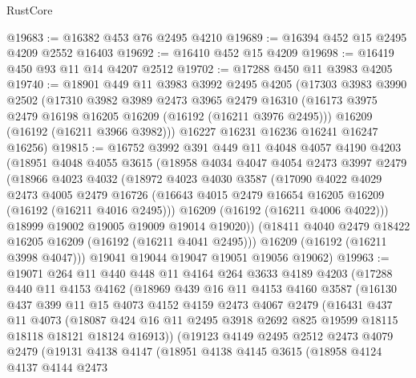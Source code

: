 \begin{lexlean}{RustCore}
\begin{coremodule}
@19683 := @16382 @453 @76 @2495 @4210
@19689 := @16394 @452 @15 @2495 @4209 @2552 @16403
@19692 := @16410 @452 @15 @4209
@19698 := @16419 @450 @93 @11 @14 @4207 @2512
@19702 := @17288 @450 @11 @3983 @4205
@19740 := @18901
    @449
    @11
    @3983
    @3992
    @2495
    @4205
    (@17303
      @3983
      @3990
      @2502
      (@17310
        @3982
        @3989
        @2473
        @3965
        @2479
        @16310
        (@16173 @3975 @2479 @16198 @16205 @16209 (@16192 (@16211 @3976 @2495)))
        @16209
        (@16192 (@16211 @3966 @3982)))
      @16227
      @16231
      @16236
      @16241
      @16247
      @16256)
@19815 := @16752
    @3992
    @391
    @449
    @11
    @4048
    @4057
    @4190
    @4203
    (@18951
      @4048
      @4055
      @3615
      (@18958
        @4034
        @4047
        @4054
        @2473
        @3997
        @2479
        (@18966
          @4023
          @4032
          (@18972
            @4023
            @4030
            @3587
            (@17090
              @4022
              @4029
              @2473
              @4005
              @2479
              @16726
              (@16643 @4015 @2479 @16654 @16205 @16209 (@16192 (@16211 @4016 @2495)))
              @16209
              (@16192 (@16211 @4006 @4022)))
            @18999
            @19002
            @19005
            @19009
            @19014
            @19020))
        (@18411 @4040 @2479 @18422 @16205 @16209 (@16192 (@16211 @4041 @2495)))
        @16209
        (@16192 (@16211 @3998 @4047)))
      @19041
      @19044
      @19047
      @19051
      @19056
      @19062)
@19963 := @19071
    @264
    @11
    @440
    @448
    @11
    @4164
    @264
    @3633
    @4189
    @4203
    (@17288
      @440
      @11
      @4153
      @4162
      (@18969
        @439
        @16
        @11
        @4153
        @4160
        @3587
        (@16130
          @437
          @399
          @11
          @15
          @4073
          @4152
          @4159
          @2473
          @4067
          @2479
          (@16431
            @437
            @11
            @4073
            (@18087 @424 @16 @11 @2495 @3918 @2692 @825 @19599 @18115 @18118 @18121 @18124 @16913))
          (@19123
            @4149
            @2495
            @2512
            @2473
            @4079
            @2479
            (@19131
              @4138
              @4147
              (@18951
                @4138
                @4145
                @3615
                (@18958
                  @4124
                  @4137
                  @4144
                  @2473

\end{coremodule}
\end{lexlean}
